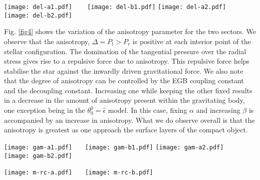 \documentclass[]{aastex631}
\begin{document}
\begin{figure*}
    \centering
    \texttt{[image: del-a1.pdf]} ~~~ \texttt{[image: del-b1.pdf]}
     \texttt{[image: del-a2.pdf]} ~~~ \texttt{[image: del-b2.pdf]}
    \caption{\textit{Top panels} (for solution $\theta^0_0=\hat{\epsilon}$) and \textit{Bottom panels}  (for solution $\theta^1_1=\hat{P}_r$) show the effective anisotropy ($\Delta$) with respect to $r/R$ for different $\alpha$ and  $\beta$. We set same numerical values as used in Fig.\ref{fig1} }
    \label{fig4}
\end{figure*}
Fig. \ref{fig4} shows the variation of the anisotropy parameter for the two sectors. We observe that the anisotropy, $\Delta = P_t > P_r$ is positive at each interior point of the stellar configuration. The domination of the tangential pressure  over the radial stress gives rise to a repulsive force due to anisotropy. This repulsive force helps stabilise the star against the inwardly driven gravitational force. We also note that the degree of anisotropy can be controlled by the EGB coupling constant and the decoupling constant. Increasing one while keeping the other fixed results in a decrease in the amount of anisotropy present within the gravitating body, one exception being in the $\theta^0_0 =\hat{\epsilon}$ model. In this case, fixing $\alpha$ and increasing $\beta$ is accompanied by an increase in anisotropy. What we do observe overall is that the anisotropy is greatest as one approach the surface layers of the compact object.
\begin{figure*}
    \centering
    \texttt{[image: gam-a1.pdf]}~~~  \texttt{[image: gam-b1.pdf]}
    \texttt{[image: gam-a2.pdf]}~~~  \texttt{[image: gam-b2.pdf]}
    \caption{\textit{Top panels} (for solution $\theta^0_0=\hat{\epsilon}$) and \textit{Bottom panels}  (for solution $\theta^1_1=\hat{P}_r$) show the adiabatic index ($\Gamma$) with respect to $r/R$ for different $\alpha$ and  $\beta$. We set same numerical values as used in Fig.\ref{fig1}. }
    \label{fig5}
\end{figure*}
\begin{figure*}
    \centering
    \texttt{[image: m-rc-a.pdf]}~~~ \texttt{[image: m-rc-b.pdf]}
    \caption{Mass versus central density for different $\alpha$ and  $\beta$ for the solution $\theta_0^0=\hat{\epsilon}$. We set same numerical values as used in Fig.\ref{fig1}.}
    \label{fig6}
\end{figure*}
\end{document}
